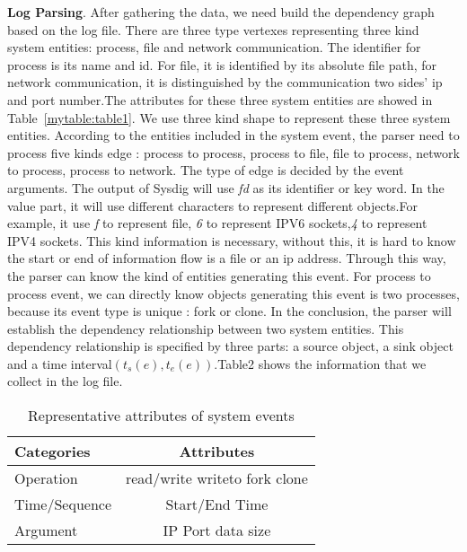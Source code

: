 \textbf{Log Parsing}.
After gathering the data, we need build the dependency graph based on the log file. There are three type vertexes representing three kind system entities: process, file and network communication.
The identifier for process is its name and id.  For file, it is identified by its absolute file path, for network communication, it is distinguished by the communication two sides' ip and port number.The attributes for these three system entities are showed in Table~\ref{mytable:table1}. We use three kind shape to represent these three system entities. According to the entities included in the system event, the parser need to process five kinds edge : process to process, process to file, file to process, network to process, process to network. The type of edge is decided by the event arguments. The output of Sysdig will use \textit{fd} as its identifier or key word. In the value part, it will use different characters to represent different objects.For example, it use \textit{f} to represent file, \textit{6} to represent IPV6 sockets,\textit{4} to represent IPV4 sockets. This kind information is necessary, without this, it is hard to know the start or end of information flow is a file or an ip address.  Through this way, the parser can know the kind of entities generating this event. For process to process event, we can directly know objects generating this event is two processes, because its event type is unique : fork or clone. In the conclusion, the parser will establish the dependency relationship between two system entities. This dependency relationship is specified by three parts: a source object, a sink object and a time interval$(t_s(e), t_e(e))$.Table2 shows the information that we collect in the log file.

\begin{table}[t!p]
	\centering
	\caption{Representation Of System Entities}
	\label{mytable:table1}
\end{table}
\begin{table}[!htp]
	\centering
	\caption{Representative attributes of system events}
	\label{table2}
	\begin{tabular}{|l|c|}
		\hline
		Categories    & Attributes                    \\ \hline
		Operation     & read/write writeto fork clone \\ \hline
		Time/Sequence & Start/End Time                \\ \hline
		Argument      & IP Port data size             \\ \hline
	\end{tabular}
\end{table}




